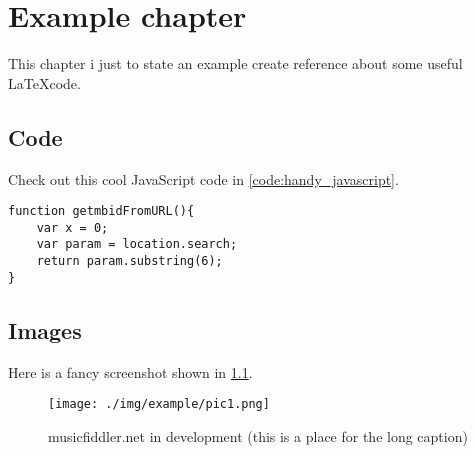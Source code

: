 \chapter{Example chapter}
This chapter i just to state an example create reference about some useful \LaTeX code.

\section{Code}
Check out this cool JavaScript code in \ref{code:handy_javascript}.

\begin{lstlisting}[caption=This is some handy JavaScript code, label=code:handy_javascript]
function getmbidFromURL(){
    var x = 0;
    var param = location.search;
    return param.substring(6);
}
\end{lstlisting}

\section{Images}
Here is a fancy screenshot shown in \ref{fig:example1}.

\begin{figure}[ht]
 \texttt{[image: ./img/example/pic1.png]}
 \caption[Short caption for table of contents here]{musicfiddler.net in development (this is a place for the long caption)}
 \label{fig:example1}
\end{figure}